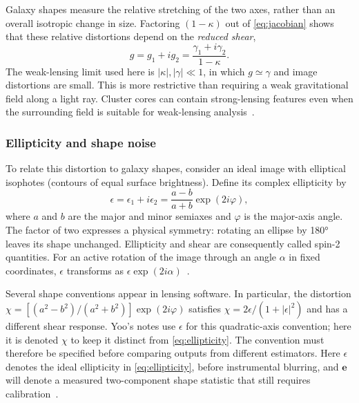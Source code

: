 Galaxy shapes measure the relative stretching of the two axes, rather than an overall isotropic change in size. Factoring $(1-\kappa)$ out of \cref{eq:jacobian} shows that these relative distortions depend on the \emph{reduced shear},
\begin{equation}
    g=g_1+ig_2=\frac{\gamma_1+i\gamma_2}{1-\kappa}.
    \label{eq:reduced-shear}
\end{equation}
The weak-lensing limit used here is $|\kappa|,|\gamma|\ll1$, in which $g\simeq\gamma$ and image distortions are small. This is more restrictive than requiring a weak gravitational field along a light ray. Cluster cores can contain strong-lensing features even when the surrounding field is suitable for weak-lensing analysis~\cite{bartelmann_weak_2001,schneider_weak_2006}.

\subsubsection{Ellipticity and shape noise}


To relate this distortion to galaxy shapes, consider an ideal image with elliptical isophotes (contours of equal surface brightness). Define its complex ellipticity by
\begin{equation}
    \epsilon=\epsilon_1+i\epsilon_2
    =\frac{a-b}{a+b}\exp(2i\varphi),
    \label{eq:ellipticity}
\end{equation}
where $a$ and $b$ are the major and minor semiaxes and $\varphi$ is the major-axis angle. The factor of two expresses a physical symmetry: rotating an ellipse by \ang{180} leaves its shape unchanged. Ellipticity and shear are consequently called spin-2 quantities. For an active rotation of the image through an angle $\alpha$ in fixed coordinates, $\epsilon$ transforms as $\epsilon\exp(2i\alpha)$~\cite{schneider_weak_2006}.

Several shape conventions appear in lensing software. In particular, the distortion $\chi=[(a^2-b^2)/(a^2+b^2)]\exp(2i\varphi)$ satisfies $\chi=2\epsilon/(1+|\epsilon|^2)$ and has a different shear response. Yoo's notes use $\epsilon$ for this quadratic-axis convention; here it is denoted $\chi$ to keep it distinct from \cref{eq:ellipticity}. The convention must therefore be specified before comparing outputs from different estimators. Here $\epsilon$ denotes the ideal ellipticity in \cref{eq:ellipticity}, before instrumental blurring, and $\boldsymbol{e}$ will denote a measured two-component shape statistic that still requires calibration~\cite{yoo_weak_2026,schneider_weak_2006}.

